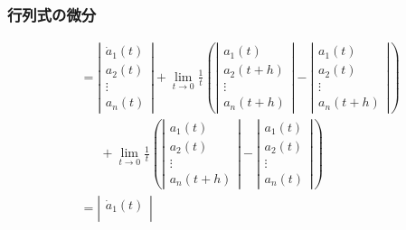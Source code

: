 \documentclass[10pt,usepdftitle=false,hyperref={unicode}]{beamer}
\newcommand{\absolute}[1]{\left|#1\right|}
\newcommand{\parentheses}[1]{\left(#1\right)}
\begin{document}
\begin{frame}
\frametitle{行列式の微分}
\begin{align*}
    &= \absolute{%
            \begin{array}{c}
                \dot{a}_1\parentheses{t} \\
                a_2\parentheses{t} \\
                \vdots \\
                a_n\parentheses{t}
            \end{array}
    } + \lim_{t \to 0}\frac{1}{t}
    \parentheses{%
        \absolute{%
            \begin{array}{c}
                a_1\parentheses{t} \\
                a_2\parentheses{t + h} \\
                \vdots \\
                a_n\parentheses{t + h}
            \end{array}
        }
        -
        \absolute{%
            \begin{array}{c}
                a_1\parentheses{t} \\
                a_2\parentheses{t} \\
                \vdots \\
                a_n\parentheses{t + h}
            \end{array}
        }
    } \\
    &\phantom{=}\ + \lim_{t \to 0}\frac{1}{t}
    \parentheses{%
        \absolute{%
            \begin{array}{c}
                a_1\parentheses{t} \\
                a_2\parentheses{t} \\
                \vdots \\
                a_n\parentheses{t + h}
            \end{array}
        }
        -
        \absolute{%
            \begin{array}{c}
                a_1\parentheses{t} \\
                a_2\parentheses{t} \\
                \vdots \\
                a_n\parentheses{t}
            \end{array}
        }
    } \\
    &=
    \absolute{%
            \begin{array}{c}
                \dot{a}_1\parentheses{t} \\

\end{array}}
\end{align*}
\end{frame}
\end{document}
